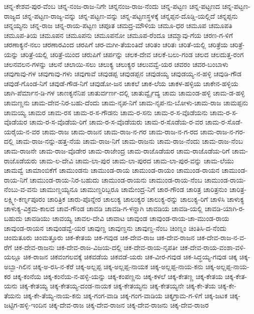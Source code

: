 {ಚನ್ನ-ಕೇಶವ-ಪುರ-ವೆಂಬ
ಚನ್ನ-ನಂಜ-ರಾಜ-ನಿಗೇ
ಚನ್ನನಂಜ-ರಾಜ-ನೆಂದು
ಚನ್ನ-ಪಟ್ಟಣ
ಚನ್ನ-ಪಟ್ಟಣದ
ಚನ್ನ-ಪಟ್ಟಣ-ರಾಜ್ಯದ
ಚನ್ನ-ಪಟ್ಟಣ-ರಾಜ್ಯ-ವನ್ನು
ಚನ್ನ-ಪಟ್ಟಣ-ವನ್ನು
ಚನ್ನ-ಪಟ್ಟಣಸ್ಥಳಕ್ಕೆ
ಚನ್ನಪ್ಪನ-ದೊಡ್ಡಿ-ಯಲ್ಲಿದೆ
ಚನ್ನಪ್ಪನು
ಚನ್ನಯ್ಯನು
ಚನ್ನ-ರಾಜ
ಚನ್ನ-ರಾಯ-ಪಟ್ಟಣ
ಚಪೂತ
ಚಮದ್ರ-ಮೌಳಿಯ
ಚಮೂ-ಧರ
ಚಮೂಪ
ಚಮೂಪತಿ
ಚಮೂಪ-ತಿಯ
ಚಮೂಪನ
ಚಮೂಪನು
ಚಮೂಪನೋ
ಚಮೂಪ-ರೆಂದೂ
ಚಮ್ಮಾವು-ಗೆಯ
ಚರಣ-ಗ-ಳಿಗೆ
ಚರಣಾಕ್ಯನೆ-ನಲು
ಚರಣಾರವಿಂದ
ಚರಪಿಗೆ
ಚರ-ಮಗೀ-ತೆಯಂತಿದೆ
ಚರಿತಂ
ಚರಿತಃ
ಚರಿತೆ-ಯಲ್ಲಿ
ಚರಿತ್ರೆಯ
ಚರಿತ್ರೆ-ಯನ್ನು
ಚರಿತ್ರೆ-ಯಲ್ಲಿ
ಚರಿತ್ರೆ-ಯಿಂದ
ಚರುಪಿಗೆ
ಚರ್ಪನ್ನು
ಚಲಕ-ದೇವ
ಚಲಕೆ-ಬಲು-ಗಂಡ
ಚಲದ
ಚಲದುತ್ತ-ರಂಗ
ಚಲನವಲನ-ಗಳನ್ನು
ಚಲನೆ
ಚಲಾಯಿ-ಸಲು
ಚಲುಕ್ಯ
ಚಲುಕ್ಯರ
ಚಲುವವ್ವೆ-ಯರ
ಚವರಂ
ಚವರ-ಬಂಬಾಳು
ಚವುಗಾವು-ಗಳ
ಚವುಗಾವು-ಗಳು
ಚವುಗಾವೆ
ಚವುಡಪ್ಪ
ಚವುಡಪ್ಪನ
ಚವುಡಯ್ಯ
ಚವುಡಯ್ಯ-ನ-ಹಳ್ಳಿ
ಚವುಡಿ-ಗೌಡ
ಚವುಡೆ-ಗೊಂಡ-ನಿಗೆ
ಚವುಡೆ-ಗೌಡ-ನಿಗೆ
ಚವುಡೋ-ಜನ
ಚಾಕಲೆ
ಚಾಕ-ಲೆಯ
ಚಾಕಳ-ಹಳ್ಳಿಯ
ಚಾಕೇನ-ಹಳ್ಳಿಯ
ಚಾಗಿ-ಪೆರ್ಮಾನ-ಡಿ-ಗಳ
ಚಾಣಕ್ಯನೆನಿಪ
ಚಾತುರ್ವರ್ಣ-ದಲ್ಲಿ
ಚಾತುರ್ವ್ವೈದ್ಯ
ಚಾಮ
ಚಾಮಂಡ-ಹಳ್ಳಿ
ಚಾಮ-ಡ-ಹಳ್ಳಿ
ಚಾಮಣ್ಣನು
ಚಾಮ-ದೇವ-ನಿರ-ಬಹು-ದೆಂದು
ಚಾಮ-ನೃಪ-ನಿಗೆ
ಚಾಮ-ನೃಪ-ನು-ಬೋಳು-ಚಾಮ-ರಾಜ
ಚಾಮಪ್ಪನು
ಚಾಮಯ್ಯ
ಚಾಮರ
ಚಾಮ-ರಸ
ಚಾಮ-ರ-ಸ-ಗೌಡನು
ಚಾಮ-ರ-ಸನು
ಚಾಮ-ರ-ಸ-ವೊಡೆಯನು
ಚಾಮ-ರ-ಸ-ವೊಡೆಯರ
ಚಾಮ-ರ-ಸ-ವೊಡೆಯ-ರಿಗೆ
ಚಾಮ-ರ-ಸ-ವೊಡೆಯರು
ಚಾಮ-ರ-ಸೊಡೆಯ-ರ-ವರ
ಚಾಮ-ರ-ಸೊಡೆ-ಯರೈಯ-ನ-ವರ
ಚಾಮ-ರಾಜ
ಚಾಮ-ರಾಜನ
ಚಾಮ-ರಾಜ-ನ-ಗರ
ಚಾಮ-ರಾಜ-ನ-ಗ-ರದ
ಚಾಮ-ರಾಜ-ನ-ಗರ-ದಲ್ಲಿ
ಚಾಮ-ರಾಜ-ನನ್ನು-ಹತ್ತ-ನೆಯ
ಚಾಮ-ರಾಜ-ನಿಗೆ
ಚಾಮ-ರಾಜನು
ಚಾಮ-ರಾಜ-ನೆಂದು
ಚಾಮ-ರಾಜ-ನೆಂಬ
ಚಾಮ-ರಾಜನೇ
ಚಾಮ-ರಾಜ-ವೊಡೇರ
ಚಾಮ-ರಾಜೇಂದ್ರ
ಚಾಮ-ರಾಜೊಡೆಯರ
ಚಾಮ-ರಾಜೊಡೆಯ-ರಿಗೆ
ಚಾಮ-ರಾಜೊಡೆಯರು
ಚಾಮ-ಲ-ದೇವಿ
ಚಾಮ-ಲಾ-ಪುರ
ಚಾಮ-ಲಾ-ಪುರದ
ಚಾಮ-ಲಾ-ಪುರ-ವನ್ನು
ಚಾಮ-ಲೆಯು
ಚಾಮವ್ವೆ
ಚಾಮಾಂಬಿಕೆಗೆ
ಚಾಮುಂಡನು
ಚಾಮುಂಡ-ರಾಯ
ಚಾಮುಂಡ-ರಾಯಂ
ಚಾಮುಂಡ-ರಾಯನ
ಚಾಮುಂಡ-ರಾಯ-ನಿಗೆ
ಚಾಮುಂಡ-ರಾಯ-ನಿರ-ಬಹುದು
ಚಾಮುಂಡ-ರಾಯನು
ಚಾಮುಂಡ-ರಾಯ-ನೆಂಬ
ಚಾಮುಂಡ-ರಾಯ-ನೆಂಬು-ವ-ವನು
ಚಾಮುಣ್ಡಯ್ಯನೂ
ಚಾಮುಣ್ಡರಿಬ್ಬರೂ
ಚಾಮೇಂದ್ರ-ನಿಗೆ
ಚಾರ-ಗೌಂಡ
ಚಾರಿತ್ರ
ಚಾರಿತ್ರನುಂ
ಚಾರಿತ್ರ-ಲಕ್ಷ್ಮೀ-ಕರ್ಣ್ನಪೂರಂ
ಚಾರಿತ್ರಿಕ
ಚಾರು-ಪೊನ್ನೇರ
ಚಾಲುಕ್ಯ
ಚಾಲುಕ್ಯರ
ಚಾಲುಕ್ಯ-ರನ್ನು
ಚಾಲುಕ್ಯ-ರಿಗೆ
ಚಾಳಿಸಿ
ಚಾಳುಕ್ಯ
ಚಾಳುಕ್ಯ-ವಿಕ್ರಮ-ಕಾಲದ
ಚಾವ-ಗೌಂಡ
ಚಾವಡಿ
ಚಾವಡಿ-ಗ-ಳನ್ನಾಗಿ
ಚಾವಡಿಯ
ಚಾವಡಿ-ಯಲ್ಲಿ
ಚಾವಡಿ-ಯಾಗಿ-ರ-ಬಹುದು
ಚಾವಡಿಯು
ಚಾವಯ್ಯ
ಚಾವಲ-ದೇವಿ
ಚಾವಾಟ
ಚಾವುಂಡ
ಚಾವುಂಡ-ರಾಯ-ಚಾ-ಮುಂಡ-ರಾಯ
ಚಾವುಂಡ-ರಾಯನ
ಚಾವುಂಡವ್ವೆ-ಯರ
ಚಾವುಣ್ಡ
ಚಾವುಣ್ಡನು
ಚಾವುಣ್ಡ-ನೆಂಬ
ಚಿಂಣ್ನಂ
ಚಿಂತಿಸಿ-ದ-ನೆಂದು
ಚಿಂಮತೂರು
ಚಿಂಮತ್ತೂರು
ಚಿಕ-ಕೇತಯ
ಚಿಕ-ಗವುಡ
ಚಿಕ-ದೇವ-ರಾಜ
ಚಿಕ-ದೇವ-ರಾಜನ
ಚಿಕ-ದೇವ-ರಾಜ-ನ-ವ-ರೆಗೆ
ಚಿಕ-ದೇವ-ರಾಜನು
ಚಿಕ-ದೇವ-ರಾಜ-ವಿಜಯ-ದಲ್ಲಿ
ಚಿಕ-ದೇವ-ರಾಯ-ನೃಪತೀ
ಚಿಕ-ದೇವ-ರಾಯ-ವಂಶಾ-ವಳಿ-ಯಲ್ಲೂ
ಚಿಕ-ರಾಜನ
ಚಿಕವಂಗಲವಕ್ಕೆ
ಚಿಕವಡೆಯ
ಚಿಕವಡೆ-ಯರು
ಚಿಕ-ವೀರ-ಗವುಡ
ಚಿಕ-ಸಿದ್ಧಯ್ಯ-ಗವುಡ
ಚಿಕ್ಕ
ಚಿಕ್ಕ-ಅಬ್ಬಾ-ಗಿಲಿನ
ಚಿಕ್ಕ-ಅ-ರಸಿ-ನ-ಕೆರೆ
ಚಿಕ್ಕ-ಅಲ್ಲಪ್ಪ
ಚಿಕ್ಕ-ಅಲ್ಲಪ್ಪ-ನಾಯಕ
ಚಿಕ್ಕ-ಅಲ್ಲಪ್ಪ-ನಾಯ-ಕನು
ಚಿಕ್ಕ-ಅಲ್ಲಪ್ಪ-ನಾಯ-ಕರ
ಚಿಕ್ಕ-ಕಂನೆಯ
ಚಿಕ್ಕ-ಕಂನೆಯ-ನ-ಹಳ್ಳಿ-ಯನ್ನು
ಚಿಕ್ಕ-ಕಂಪಣ್ಣನು
ಚಿಕ್ಕ-ಕಳಲೆ
ಚಿಕ್ಕ-ಕೇತಣ್ಣ
ಚಿಕ್ಕ-ಕೇತಯ
ಚಿಕ್ಕ-ಕೇತ-ಯನು
ಚಿಕ್ಕ-ಕೇತಯ್ಯ
ಚಿಕ್ಕ-ಕೇತಯ್ಯ-ದಂಡ-ನಾಯಕ
ಚಿಕ್ಕ-ಕೇತಯ್ಯನು
ಚಿಕ್ಕ-ಕೇತಯ್ಯನೇ
ಚಿಕ್ಕ-ಕೇ-ತೆಯ
ಚಿಕ್ಕ-ಕೇ-ತೆಯನು
ಚಿಕ್ಕ-ಕೇ-ತೆಯ್ಯ-ನಾಯ-ಕನು
ಚಿಕ್ಕ-ಗಂಗ-ವಾಡಿ
ಚಿಕ್ಕ-ಗಂಗ-ವಾಡಿಯ
ಚಿಕ್ಕಗ್ರಾಮ-ಗ-ಳಿಗೆ
ಚಿಕ್ಕ-ಜಟಕ
ಚಿಕ್ಕ-ಜಟ್ಟಿಗ-ಹಳ್ಳಿ-ಇಂದಿನ
ಚಿಕ್ಕ-ದೇವ-ರಾಜ
ಚಿಕ್ಕ-ದೇವ-ರಾಜನ
ಚಿಕ್ಕ-ದೇವ-ರಾಜನು
ಚಿಕ್ಕ-ದೇವ-ರಾಜರ
}
